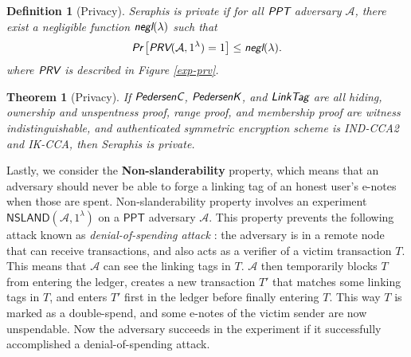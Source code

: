 \documentclass{article}
\theoremstyle{plain}
\newtheorem{definition}{Definition}[section]
\newtheorem{theorem}{Theorem}[section]
\theoremstyle{remark}
\begin{document}
\begin{definition}[Privacy]
Seraphis is private if for all $\emph{\textsf{PPT}}$ adversary $\mathcal{A}$, there exist a negligible function $\emph{\textsf{negl}}(\lambda)$ such that
\begin{align*}
\emph{\textsf{Pr}}
\left[
\emph{\textsf{PRV}}(\mathcal{A}, 1^{\lambda})=1
\right]
\le \emph{\textsf{negl}}(\lambda).
\end{align*}
where $\emph{\textsf{PRV}}$ is described in Figure \ref{exp-prv}.
\end{definition}
\begin{theorem}[Privacy]\label{thm-prv}
If $\emph{\textsf{PedersenC}}$, $\emph{\textsf{PedersenK}}$, and $\emph{\textsf{LinkTag}}$ are all hiding, ownership and unspentness proof, range proof, and membership proof are witness indistinguishable, and authenticated symmetric encryption scheme is IND-CCA2 and IK-CCA, then Seraphis is private.  
\end{theorem}

Lastly, we consider the \textbf{Non-slanderability} property, which means that an adversary should never be able to forge a linking tag of an honest user's e-notes when those are spent. Non-slanderability property involves an experiment $\textsf{NSLAND}(\mathcal{A}, 1^{\lambda})$ on a $\textsf{PPT}$ adversary $\mathcal{A}$. This property prevents the following attack known as \textit{denial-of-spending attack} \cite{denial-of-spend}: the adversary is in a remote node that can receive transactions, and also acts as a verifier of a victim transaction $T$. This means that $\mathcal{A}$ can see the linking tags in $T$. $\mathcal{A}$ then temporarily blocks $T$ from entering the ledger, creates a new transaction $T'$ that matches some linking tags in $T$, and enters $T'$ first in the ledger before finally entering $T$. This way $T$ is marked as a double-spend, and some e-notes of the victim sender are now unspendable. Now the adversary succeeds in the experiment if it successfully accomplished a denial-of-spending attack.
\end{document}
